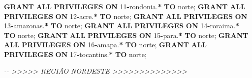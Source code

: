 \documentclass[
]{book}
\newenvironment{Shaded}{\begin{snugshade}}{\end{snugshade}}
\newcommand{\CommentTok}[1]{\textcolor[rgb]{0.56,0.35,0.01}{\textit{#1}}}
\newcommand{\DecValTok}[1]{\textcolor[rgb]{0.00,0.00,0.81}{#1}}
\newcommand{\KeywordTok}[1]{\textcolor[rgb]{0.13,0.29,0.53}{\textbf{#1}}}
\newcommand{\NormalTok}[1]{#1}
\newcommand{\OperatorTok}[1]{\textcolor[rgb]{0.81,0.36,0.00}{\textbf{#1}}}
\newcommand{\StringTok}[1]{\textcolor[rgb]{0.31,0.60,0.02}{#1}}
\begin{document}
\begin{Shaded}
\begin{Highlighting}[]
\KeywordTok{GRANT} \KeywordTok{ALL} \KeywordTok{PRIVILEGES} \KeywordTok{ON}\NormalTok{ \textasciigrave{}}\DecValTok{11}\OperatorTok{{-}}\NormalTok{rondonia\textasciigrave{}.}\OperatorTok{*}       \KeywordTok{TO} \StringTok{\textquotesingle{}norte\textquotesingle{}}\NormalTok{;}
\KeywordTok{GRANT} \KeywordTok{ALL} \KeywordTok{PRIVILEGES} \KeywordTok{ON}\NormalTok{ \textasciigrave{}}\DecValTok{12}\OperatorTok{{-}}\NormalTok{acre\textasciigrave{}.}\OperatorTok{*}           \KeywordTok{TO} \StringTok{\textquotesingle{}norte\textquotesingle{}}\NormalTok{;}
\KeywordTok{GRANT} \KeywordTok{ALL} \KeywordTok{PRIVILEGES} \KeywordTok{ON}\NormalTok{ \textasciigrave{}}\DecValTok{13}\OperatorTok{{-}}\NormalTok{amazonas\textasciigrave{}.}\OperatorTok{*}       \KeywordTok{TO} \StringTok{\textquotesingle{}norte\textquotesingle{}}\NormalTok{;}
\KeywordTok{GRANT} \KeywordTok{ALL} \KeywordTok{PRIVILEGES} \KeywordTok{ON}\NormalTok{ \textasciigrave{}}\DecValTok{14}\OperatorTok{{-}}\NormalTok{roraima\textasciigrave{}.}\OperatorTok{*}        \KeywordTok{TO} \StringTok{\textquotesingle{}norte\textquotesingle{}}\NormalTok{;}
\KeywordTok{GRANT} \KeywordTok{ALL} \KeywordTok{PRIVILEGES} \KeywordTok{ON}\NormalTok{ \textasciigrave{}}\DecValTok{15}\OperatorTok{{-}}\NormalTok{para\textasciigrave{}.}\OperatorTok{*}           \KeywordTok{TO} \StringTok{\textquotesingle{}norte\textquotesingle{}}\NormalTok{;}
\KeywordTok{GRANT} \KeywordTok{ALL} \KeywordTok{PRIVILEGES} \KeywordTok{ON}\NormalTok{ \textasciigrave{}}\DecValTok{16}\OperatorTok{{-}}\NormalTok{amapa\textasciigrave{}.}\OperatorTok{*}          \KeywordTok{TO} \StringTok{\textquotesingle{}norte\textquotesingle{}}\NormalTok{;}
\KeywordTok{GRANT} \KeywordTok{ALL} \KeywordTok{PRIVILEGES} \KeywordTok{ON}\NormalTok{ \textasciigrave{}}\DecValTok{17}\OperatorTok{{-}}\NormalTok{tocantins\textasciigrave{}.}\OperatorTok{*}      \KeywordTok{TO} \StringTok{\textquotesingle{}norte\textquotesingle{}}\NormalTok{;}

\CommentTok{{-}{-} \textgreater{}\textgreater{}\textgreater{}\textgreater{}\textgreater{} REGIÃO NORDESTE \textgreater{}\textgreater{}\textgreater{}\textgreater{}\textgreater{}\textgreater{}\textgreater{}\textgreater{}\textgreater{}\textgreater{}\textgreater{}\textgreater{}\textgreater{}\textgreater{}}


\end{Highlighting}
\end{Shaded}
\end{document}
